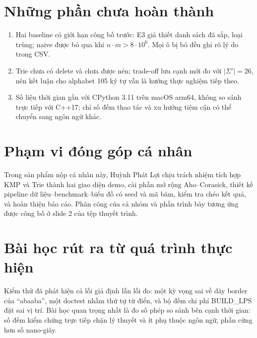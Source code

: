 \section{Những phần chưa hoàn thành}
\label{sec:8-2}

\begin{enumerate}
\item
  Hai baseline có giới hạn công bố trước: E3 giả thiết danh sách đã sắp,
  loại trùng; naive được bỏ qua khi $n\cdot m>8\cdot10^6$. Mọi ô bị bỏ
  đều ghi rõ lý do trong CSV.
\item
  Trie chưa có delete và chưa được nén; trade-off lưu cạnh mới đo với
  $\lvert\Sigma'\rvert=26$, nên kết luận cho alphabet 105 ký tự vẫn là
  hướng thực nghiệm tiếp theo.
\item
  Số liệu thời gian gắn với CPython 3.11 trên macOS arm64, không so sánh
  trực tiếp với C++17; chỉ số đếm thao tác và xu hướng tiệm cận có thể
  chuyển sang ngôn ngữ khác.
\end{enumerate}

\section{Phạm vi đóng góp cá nhân}
\label{sec:8-3}

Trong sản phẩm nộp cá nhân này, Huỳnh Phát Lợi chịu trách nhiệm tích hợp
KMP và Trie thành hai giao diện demo, cài phần mở rộng Aho--Corasick,
thiết kế pipeline dữ liệu--benchmark--biểu đồ có seed và mã băm, kiểm tra
chéo kết quả, và hoàn thiện báo cáo. Phân công của cả nhóm và phần trình
bày tương ứng được công bố ở slide 2 của tệp thuyết trình.

\section{Bài học rút ra từ quá trình thực hiện}
\label{sec:8-4}

Kiểm thử đã phát hiện cả lỗi giả định lẫn lỗi đo: một kỳ vọng sai về dãy
border của ``abaaba'', một doctest nhầm thứ tự từ điển, và bộ đếm chi
phí BUILD\_LPS đặt sai vị trí. Bài học quan trọng nhất là đo số phép so
sánh bên cạnh thời gian: số đếm kiểm chứng trực tiếp chặn lý thuyết và
ít phụ thuộc ngôn ngữ, phần cứng hơn số nano-giây.
